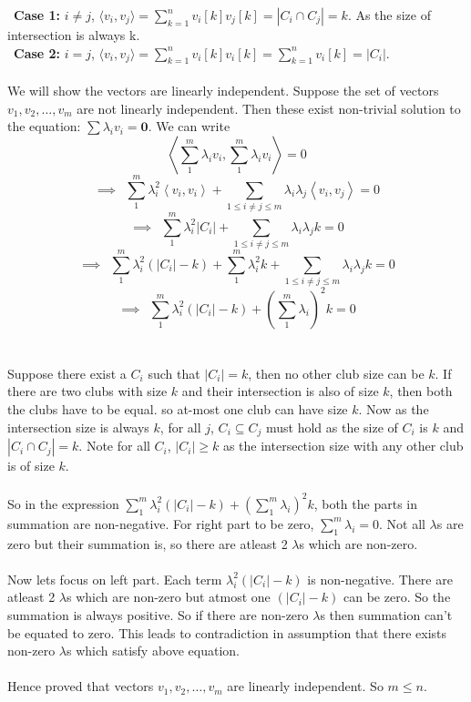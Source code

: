 ~\textbf{Case 1:} $i\neq j$, $\langle v_i,v_j\rangle = \sum_{k=1}^{n} v_i[k]v_j[k] = | C_i \cap C_j | = k$. As the size of intersection is always k.\\

~\textbf{Case 2:} $i= j$, $\langle v_i,v_j\rangle = \sum_{k=1}^{n} v_i[k]v_i[k] = \sum_{k=1}^{n} v_i[k]= |C_i|$.\\\\
We will show the vectors are linearly independent. Suppose the set of vectors $v_1, v_2, \hdots, v_m$ are not linearly independent. Then these exist non-trivial solution to the equation: $\sum \lambda_i v_i=\textbf{0}$. We can write\\
$$ \left \langle \sum_1^m \lambda_i v_i,\sum_1^m \lambda_i v_i \right\rangle = 0$$
$$\implies ~~ \sum_1^m \lambda_i^2 \left \langle   v_i, v_i \right\rangle + \sum_{1\le i \neq j\le m} \lambda_i \lambda_j \left \langle   v_i, v_j \right\rangle = 0$$
$$\implies ~~ \sum_1^m \lambda_i^2 |C_i| + \sum_{1\le i \neq j\le m} \lambda_i \lambda_j k = 0$$
$$\implies ~~ \sum_1^m \lambda_i^2 (|C_i|-k) +\sum_1^m \lambda_i^2k + \sum_{1\le i \neq j\le m} \lambda_i \lambda_j k = 0$$
$$\implies ~~ \sum_1^m \lambda_i^2 (|C_i|-k) +(\sum_1^m \lambda_i)^2k = 0$$\\\\

Suppose there exist a $C_i$ such that $|C_i|=k$, then no other club size can be $k$. If there are two clubs with size $k$ and their intersection is also of size $k$, then both the clubs have to be equal. so at-most one club can have size $k$. Now as the intersection size is always $k$, for all $j$, $C_i \subseteq C_j$ must hold as the size of $C_i$ is $k$ and $|C_i \cap C_j |=k$. Note for all $C_i$, $|C_i|\ge k$ as the intersection size with any other club is of size $k$.\\\\
So in the expression $\sum_1^m \lambda_i^2 (|C_i|-k) +(\sum_1^m \lambda_i)^2k$, both the parts in summation are non-negative. For right part to be zero, $\sum_1^m \lambda_i =0$. Not all $\lambda$s are zero but their summation is, so there are atleast 2 $\lambda$s which are non-zero.\\\\
Now lets focus on left part. Each term $\lambda_i^2 (|C_i|-k)$ is non-negative.  There are atleast 2 $\lambda$s which are non-zero but atmost one $(|C_i|-k)$ can be zero. So the summation is always positive. So if there are non-zero $\lambda$s then summation can't be equated to zero. This leads to contradiction in assumption that there exists non-zero $\lambda$s which satisfy above equation.\\\\
Hence proved that vectors $v_1, v_2, \hdots, v_m$ are linearly independent. So $m\le n$.

